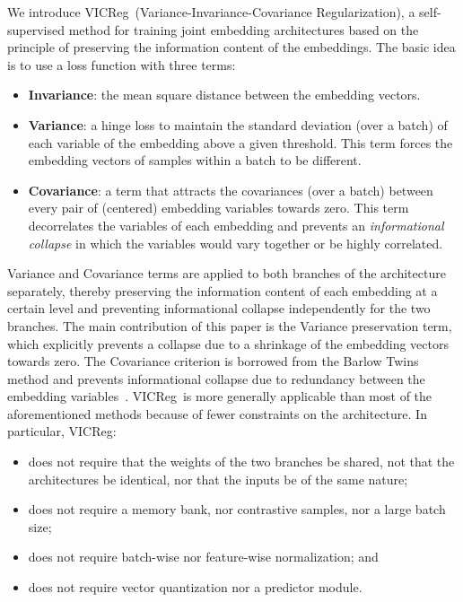 \documentclass{article} %
\newcommand{\algo}{VICReg}
\begin{document}
We introduce \algo \ (Variance-Invariance-Covariance Regularization), a self-supervised method for training joint embedding architectures based on the principle of preserving the information content of the embeddings. 
The basic idea is to use a loss function with three terms:
\begin{itemize}
    \item {\bf Invariance}: the mean square distance between the embedding vectors.
    \item {\bf Variance}: a hinge loss to maintain the standard deviation (over a batch) of each variable of the embedding above a given threshold. This term forces the embedding vectors of samples within a batch to be different.
    \item {\bf Covariance}: a term that attracts the covariances (over a batch) between every pair of (centered) embedding variables towards zero. This term decorrelates the variables of each embedding and prevents an {\em informational collapse} in which the variables would vary together or be highly correlated.
\end{itemize}
Variance and Covariance terms are applied to both branches of the architecture separately, thereby preserving the information content of each embedding at a certain level and preventing informational collapse independently for the two branches.
The main contribution of this paper is the Variance preservation term, which explicitly prevents a collapse due to a shrinkage of the embedding vectors towards zero.
The Covariance criterion is borrowed from the Barlow Twins method and prevents informational collapse due to redundancy between the embedding variables~\cite{zbontar2021barlow}. \algo \ is more generally applicable than most of the aforementioned methods because of fewer constraints on the architecture. In particular, \algo :
\begin{itemize}
    \item does not require that the weights of the two branches be shared, not that the architectures be identical, nor that the inputs be of the same nature;
    \item does not require a memory bank, nor contrastive samples, nor a large batch size;
    \item does not require batch-wise nor feature-wise normalization; and
    \item does not require vector quantization nor a predictor module.
\end{itemize}
\end{document}
